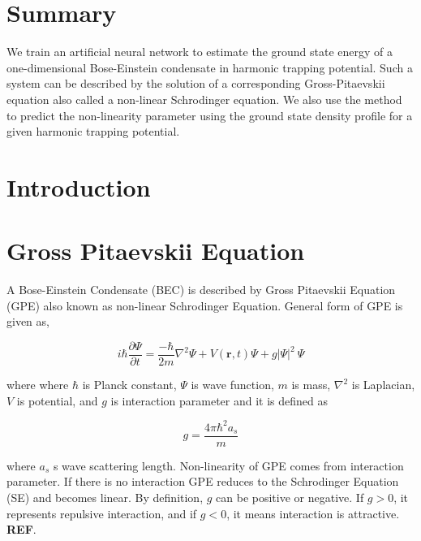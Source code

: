 \documentclass[a4paper,times,12pt]{article}
\title{}%
\date{}
\begin{document}
\setcounter{page}{1}

\section*{Summary}

We train an artificial neural network to estimate the ground state energy
of a one-dimensional Bose-Einstein condensate in harmonic trapping potential.
Such a system can be described by the solution of a corresponding
Gross-Pitaevskii equation also called a non-linear Schrodinger equation.
We also use the method to predict the non-linearity parameter using the ground
state density profile for a given harmonic trapping potential.


\section{Introduction}
\section{Gross Pitaevskii Equation}

A Bose-Einstein Condensate (BEC) is described by Gross Pitaevskii Equation (GPE) also known as non-linear Schrodinger Equation. General form of GPE is given as,

\begin{equation}
\label{eq:GPE_3D}
i \hbar \frac {\partial \Psi}{\partial t} = \frac {-\hbar}{2m}\nabla^2
\Psi + V(\boldsymbol{r}, t)\Psi + g|\Psi|^2\ \Psi
\end{equation}


where %
where $\hbar$ is Planck constant, $\Psi$ is wave function, $m$ is mass, $\nabla^2$ is Laplacian, $V$ is potential, and $g$ is interaction parameter and it is defined as 

\begin{equation}
\label{eq:inter_param}
g=\frac{4\pi\hbar^2a_s}{m}
\end{equation}

where $a_s$ s wave scattering length. Non-linearity of GPE comes from interaction parameter. If there is no interaction GPE reduces to the Schrodinger Equation (SE) and becomes linear. By definition, $g$ can be positive or negative. If $g > 0$, it represents repulsive interaction, and if $g < 0$, it means interaction is attractive. \textbf{REF}. 
\end{document}

